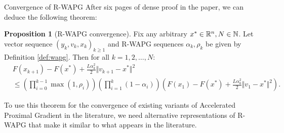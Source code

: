 \documentclass[11pt]{beamer}
\theoremstyle{definition}
\newtheorem{proposition}{Proposition}[section]
\begin{document}
        \begin{frame}{Convergence of R-WAPG}
            After six pages of dense proof in the paper, we can deduce the following theorem: 
            \begin{proposition}[R-WAPG convergence]\label{prop:wapg-convergence}
                Fix any arbitrary $x^* \in \mathbb R^n, N \in \mathbb N$.
                Let vector sequence $(y_k, v_{k}, x_{k})_{k \ge 1}$ and R-WAPG sequences $\alpha_k, \rho_k$ be given by Definition \ref{def:wapg}.
                Then for all $k = 1, 2, \ldots, N$:
                {\small
                \begin{align*}
                    & F(x_{k + 1}) - F(x^*) + \frac{L \alpha_k^2}{2}\Vert v_{k + 1} - x^*\Vert^2
                    \\
                    &\le
                    \left(
                        \prod_{i = 0}^{k - 1} \max(1, \rho_{i})
                    \right)
                    \left(
                        \prod_{i = 1}^{k} \left(1  - \alpha_i\right)
                    \right)
                    \left(
                        F(x_1) - F(x^*) + \frac{L\alpha_0^2}{2}\Vert v_1 - x^*\Vert^2
                    \right).
                \end{align*}
                }
            \end{proposition}
            To use this theorem for the convergence of existing variants of Accelerated Proximal Gradient in the literature, we need alternative representations of R-WAPG that make it similar to what appears in the literature. 
        \end{frame}
\end{document}
